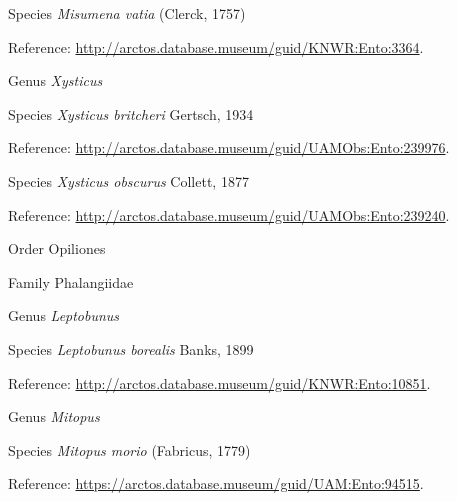 \documentclass[9pt, article]{memoir}
\begin{document}
\begin{multicols}{2}
\vspace{6pt}\noindent\hspace{36pt}Species \textit{Misumena vatia} (Clerck, 1757)


\vspace{6pt}Reference: 
\url{http://arctos.database.museum/guid/KNWR:Ento:3364}.

\vspace{6pt}\noindent\hspace{30pt}Genus \textit{Xysticus}


\vspace{6pt}\noindent\hspace{36pt}Species \textit{Xysticus britcheri} Gertsch, 1934


\vspace{6pt}Reference: 
\url{http://arctos.database.museum/guid/UAMObs:Ento:239976}.

\vspace{6pt}\noindent\hspace{36pt}Species \textit{Xysticus obscurus} Collett, 1877


\vspace{6pt}Reference: 
\url{http://arctos.database.museum/guid/UAMObs:Ento:239240}.

\vspace{6pt}\noindent\hspace{18pt}Order Opiliones


\vspace{6pt}\noindent\hspace{24pt}Family Phalangiidae


\vspace{6pt}\noindent\hspace{30pt}Genus \textit{Leptobunus}


\vspace{6pt}\noindent\hspace{36pt}Species \textit{Leptobunus borealis} Banks, 1899


\vspace{6pt}Reference: 
\url{http://arctos.database.museum/guid/KNWR:Ento:10851}.

\vspace{6pt}\noindent\hspace{30pt}Genus \textit{Mitopus}


\vspace{6pt}\noindent\hspace{36pt}Species \textit{Mitopus morio} (Fabricus, 1779)


\vspace{6pt}Reference: 
\url{https://arctos.database.museum/guid/UAM:Ento:94515}.


\end{multicols}
\end{document}
